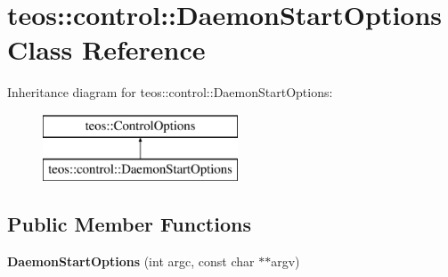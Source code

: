 \hypertarget{classteos_1_1control_1_1_daemon_start_options}{}\section{teos\+:\+:control\+:\+:Daemon\+Start\+Options Class Reference}
\label{classteos_1_1control_1_1_daemon_start_options}
Inheritance diagram for teos\+:\+:control\+:\+:Daemon\+Start\+Options\+:\begin{figure}[H]
\begin{center}
\leavevmode
\includegraphics[height=2.000000cm]{classteos_1_1control_1_1_daemon_start_options}
\end{center}
\end{figure}
\subsection*{Public Member Functions}
\begin{DoxyCompactItemize}
\item 
\mbox{\label{classteos_1_1control_1_1_daemon_start_options_ad5c4bad7dbec78a18444db1be27b7b2b}} 
{\bfseries Daemon\+Start\+Options} (int argc, const char $\ast$$\ast$argv)
\end{DoxyCompactItemize}
